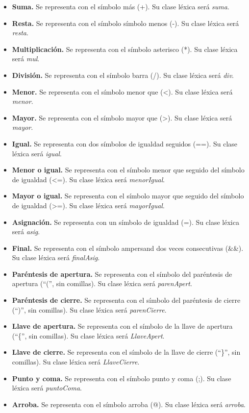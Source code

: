 \begin{itemize}
    \item \textbf{Suma.} Se representa con el símbolo más (+). Su clase léxica será \textit{suma}.
    \item \textbf{Resta.} Se representa con el símbolo símbolo menos (-). Su clase léxica será \textit{resta}.
    \item \textbf{Multiplicación.} Se representa con el símbolo asterisco (*). Su clase léxica será \textit{mul}.
    \item \textbf{División.} Se representa con el símbolo barra (/). Su clase léxica será \textit{div}.
    \item \textbf{Menor.} Se representa con el símbolo menor que (<). Su clase léxica será \textit{menor}.
    \item \textbf{Mayor.} Se representa con el símbolo mayor que (>). Su clase léxica será \textit{mayor}.
    \item \textbf{Igual.} Se representa con dos símbolos de igualdad seguidos (==). Su clase léxica será \textit{igual}.
    \item \textbf{Menor o igual.} Se representa con el símbolo menor que seguido del símbolo de igualdad (<=). Su clase léxica será \textit{menorIgual}.
    \item \textbf{Mayor o igual.} Se representa con el símbolo mayor que seguido del símbolo de igualdad (>=). Su clase léxica será \textit{mayorIgual}.
    \item \textbf{Asignación.} Se representa con un símbolo de igualdad (=). Su clase léxica será \textit{asig}.
    \item \textbf{Final.} Se representa con el símbolo ampersand dos veces consecutivas (\&\&). Su clase léxica será \textit{finalAsig}.
    \item \textbf{Paréntesis de apertura.} Se representa con el símbolo del paréntesis de apertura (``('', sin comillas). Su clase léxica será \textit{parenApert}.
    \item \textbf{Paréntesis de cierre.} Se representa con el símbolo del paréntesis de cierre (``)'', sin comillas). Su clase léxica será \textit{parenCierre}.
    \item \textbf{Llave de apertura.} Se representa con el símbolo de la llave de apertura (``\{'', sin comillas). Su clase léxica será \textit{LlaveApert}.
    \item \textbf{Llave de cierre.} Se representa con el símbolo de la llave de cierre (``\}'', sin comillas). Su clase léxica será \textit{LlaveCierre}.
    \item \textbf{Punto y coma.} Se representa con el símbolo punto y coma (;). Su clase léxica será \textit{puntoComa}.
    \item \textbf{Arroba.} Se representa con el símbolo arroba (@). Su clase léxica será \textit{arroba}.
\end{itemize}
